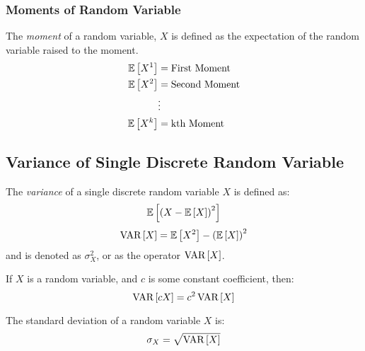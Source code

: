 		\subsubsection{Moments of Random Variable} \label{subsubsec:Moments of a Random Variable}
			\begin{definition}[Moment]
				The \emph{moment} of a random variable, $X$ is defined as the expectation of the random variable raised to the moment.
				\begin{equation} \label{eq:Moments of a Random Variable}
					\begin{aligned}
						\operatorname{\mathbb{E}} \left[ X^{1} \right] &= \text{First Moment} \\
						\operatorname{\mathbb{E}} \left[ X^{2} \right] &= \text{Second Moment} \\
						&\vdots \\
						\operatorname{\mathbb{E}} \left[ X^{k} \right] &= \text{kth Moment} \\
					\end{aligned}
				\end{equation}
			\end{definition}					
	
	\subsection{Variance of Single Discrete Random Variable} \label{subsec:Variance of Single Discrete}
		\begin{definition}[Variance] \label{def:Variance of Single Discrete}
			The \emph{variance} of a single discrete random variable $X$ is defined as:
			\begin{equation} \label{eq:Variance of Single Discrete, Form 1}
				\operatorname{\mathbb{E}} \left[ \left( X - \operatorname{\mathbb{E}} \left[ X \right] \right)^{2} \right]
			\end{equation}
			\begin{equation} \label{eq:Variance of Single Discrete, Form 2}
				\operatorname{\text{VAR}} \left[ X \right] = \operatorname{\mathbb{E}} \left[ X^{2} \right] - \left( \operatorname{\mathbb{E}} \left[ X \right] \right)^{2}
			\end{equation}
			and is denoted as $\sigma_{X}^{2}$, or as the operator $\operatorname{\text{VAR}} \left[ X \right]$.
			\begin{remark} \label{rmk:Constant in Variance}
				If $X$ is a random variable, and $c$ is some constant coefficient, then:
				\begin{equation}
					\operatorname{\text{VAR}} \left[ cX \right] = c^{2} \operatorname{\text{VAR}} \left[ X \right]
				\end{equation}
			\end{remark}
		\end{definition}
		\begin{definition} \label{def:Standard Deviation}
			The standard deviation of a random variable $X$ is:
			\begin{equation} \label{eq:Standard Deviation}
				\sigma_{X} = \sqrt{\operatorname{\text{VAR}} \left[ X \right]}
			\end{equation}
		\end{definition}
	
